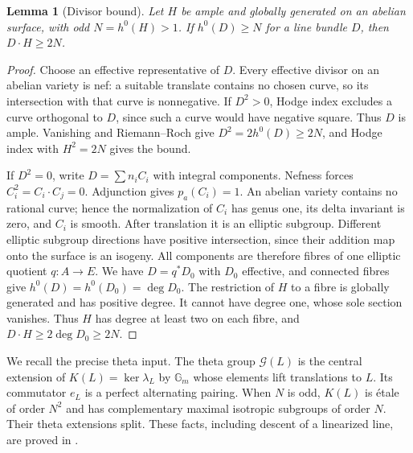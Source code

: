 \documentclass[11pt]{article}
\newtheorem{lemma}[theorem]{Lemma}
\theoremstyle{definition}\newtheorem{definition}[theorem]{Definition}
\theoremstyle{remark}\newtheorem{remark}[theorem]{Remark}
\begin{document}
\begin{lemma}[Divisor bound]\label{lem:divisor}
Let $H$ be ample and globally generated on an abelian surface, with odd $N=h^0(H)>1$. If $h^0(D)\ge N$ for a line bundle $D$, then $D\cdot H\ge2N$.
\end{lemma}
\begin{proof}
Choose an effective representative of $D$. Every effective divisor on an abelian variety is nef: a suitable translate contains no chosen curve, so its intersection with that curve is nonnegative. If $D^2>0$, Hodge index excludes a curve orthogonal to $D$, since such a curve would have negative square. Thus $D$ is ample. Vanishing and Riemann--Roch give $D^2=2h^0(D)\ge2N$, and Hodge index with $H^2=2N$ gives the bound.

If $D^2=0$, write $D=\sum n_iC_i$ with integral components. Nefness forces $C_i^2=C_i\cdot C_j=0$. Adjunction gives $p_a(C_i)=1$. An abelian variety contains no rational curve; hence the normalization of $C_i$ has genus one, its delta invariant is zero, and $C_i$ is smooth. After translation it is an elliptic subgroup. Different elliptic subgroup directions have positive intersection, since their addition map onto the surface is an isogeny. All components are therefore fibres of one elliptic quotient $q:A\to E$. We have $D=q^*D_0$ with $D_0$ effective, and connected fibres give $h^0(D)=h^0(D_0)=\deg D_0$. The restriction of $H$ to a fibre is globally generated and has positive degree. It cannot have degree one, whose sole section vanishes. Thus $H$ has degree at least two on each fibre, and $D\cdot H\ge2\deg D_0\ge2N$.
\end{proof}

We recall the precise theta input. The theta group $\mathcal G(L)$ is the central extension of $K(L)=\ker\lambda_L$ by $\mathbb G_m$ whose elements lift translations to $L$. Its commutator $e_L$ is a perfect alternating pairing. When $N$ is odd, $K(L)$ is \'etale of order $N^2$ and has complementary maximal isotropic subgroups of order $N$. Their theta extensions split. These facts, including descent of a linearized line, are proved in \citet[Theorem~8.10 and Corollary~8.11, pp.~116--117; Proposition~8.19, Corollary~8.20, Lemma~8.24 and Theorem~8.28, pp.~119--123]{EGM}.
\end{document}
